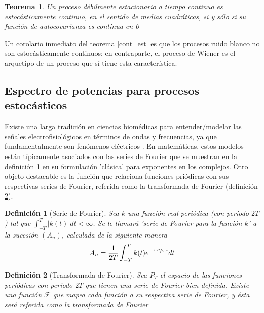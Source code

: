 \documentclass[12pt,a4paper]{mitthesis}
\newtheorem{defn}{Definici\'on}
\newtheorem{thrm}{Teorema}
\newcommand{\simint}[1]{\int_{- #1 }^{ #1 }}
\newcommand{\abso}[1]{\left| #1 \right|}
\begin{document}
\begin{thrm}
Un proceso d\'ebilmente estacionario a tiempo continuo es estoc\'asticamente continuo, en el 
sentido de medias cuadr\'aticas, si y s\'olo si su funci\'on de autocovarianza es continua en 0
\label{cont_est_deb}
\end{thrm}

Un corolario inmediato del teorema \ref{cont_est} es que los procesos ruido blanco no son
estoc\'asticamente continuos; en contraparte, el proceso de Wiener es el arquetipo de un proceso 
que s\'i tiene esta caracter\'istica.


\subsection{Espectro de potencias para procesos estoc\'asticos}

Existe una larga tradici\'on en ciencias biom\'edicas para entender/modelar las se\~nales
electrofisiol\'ogicos en t\'erminos de ondas y frecuencias, ya que fundamentalmente son fen\'omenos 
el\'ectricos \cite{Kaiser00}.  
En matem\'aticas, estos modelos est\'an t\'ipicamente asociados con las series de Fourier que se 
muestran en la definici\'on \ref{FourierClasico} en su formulaci\'on 'cl\'asica' para exponentes en 
los complejos. Otro objeto destacable es la funci\'on que relaciona funciones pri\'odicas con sus 
respectivas series de Fourier, referida como la transformada de Fourier (definici\'on 
\ref{trFourier}).

\begin{defn}[Serie de Fourier]
Sea $k$ una funci\'on real peri\'odica (con periodo $2T$) tal que 
$\simint{T} \abso{k(t)} dt < \infty$. 
Se le llamar\'a 'serie de Fourier para la funci\'on $k$' a la sucesi\'on $\left( A_n \right)$, 
calculada de la siguiente manera
\begin{equation*}
A_n = \frac{1}{2 T} \simint{T} k(t) e^{-\nicefrac{ i n t}{2T}} dt
\end{equation*}
\label{FourierClasico}
\end{defn}

\begin{defn}[Transformada de Fourier]
Sea $P_T$ el espacio de las funciones peri\'odicas con periodo $2T$ que tienen una serie de Fourier 
bien definida. Existe una funci\'on $\mathcal{F}$ que mapea cada funci\'on a su respectiva serie de 
Fourier, y \'esta ser\'a referida como la transformada de Fourier
\label{trFourier}
\end{defn}
\end{document}
